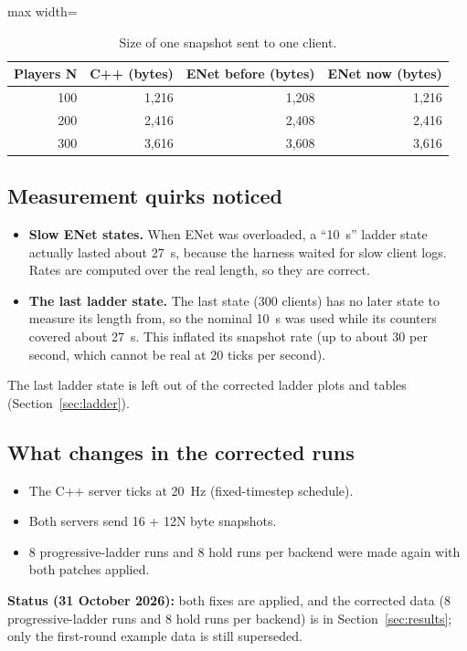 \IfFileExists{IEEEtran.cls}{\ieeetrue\documentclass[conference]{IEEEtran}}{\ieeefalse\documentclass[twocolumn,10pt]{article}}
\begin{document}
\begin{table}[H]
\caption{Size of one snapshot sent to one client.}
\label{tab:snapsize}
\centering
\footnotesize
\begin{adjustbox}{max width=\columnwidth}\begin{tabular}{rrrr}
\toprule
Players N & C++ (bytes) & ENet before (bytes) & ENet now (bytes) \\
\midrule
100 & 1,216 & 1,208 & 1,216 \\
200 & 2,416 & 2,408 & 2,416 \\
300 & 3,616 & 3,608 & 3,616 \\
\bottomrule
\end{tabular}\end{adjustbox}
\end{table}

\subsection{Measurement quirks noticed}
\begin{itemize}
\item \textbf{Slow ENet states.} When ENet was overloaded, a ``10~s'' ladder state actually lasted about 27~s, because the harness waited for slow client logs. Rates are computed over the real length, so they are correct.
\item \textbf{The last ladder state.} The last state (300 clients) has no later state to measure its length from, so the nominal 10~s was used while its counters covered about 27~s. This inflated its snapshot rate (up to about 30 per second, which cannot be real at 20 ticks per second).
\end{itemize}
The last ladder state is left out of the corrected ladder plots and tables (Section~\ref{sec:ladder}).

\subsection{What changes in the corrected runs}
\begin{itemize}
\item The C++ server ticks at 20~Hz (fixed-timestep schedule).
\item Both servers send 16 + 12N byte snapshots.
\item 8 progressive-ladder runs and 8 hold runs per backend were made again with both patches applied.
\end{itemize}
\textbf{Status (31 October 2026):} both fixes are applied, and the corrected data (8 progressive-ladder runs and 8 hold runs per backend) is in Section~\ref{sec:results}; only the first-round example data is still superseded.
\end{document}

